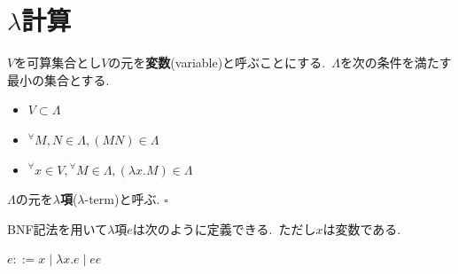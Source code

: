 \section{$\lambda$計算}

\begin{definition}
$V$を可算集合とし$V$の元を\textbf{変数}(variable)と呼ぶことにする.\ $\Lambda$を次の条件を満たす最小の集合とする.
\begin{itemize}
    \item $V \subset \Lambda$
    \item ${^{\forall}}M, N \in \Lambda, (M N) \in \Lambda$
    \item ${^{\forall}}x \in V, {^{\forall}}M \in \Lambda, (\lambda x.M) \in \Lambda$
\end{itemize}
$\Lambda$の元を\textbf{$\lambda$項}($\lambda$-term)と呼ぶ.
\hfill $\square$
\end{definition}

BNF記法を用いて$\lambda$項$e$は次のように定義できる.\ ただし$x$は変数である.
\begin{center}
$e ::= x \mid \lambda x. e \mid e e$
\end{center}


